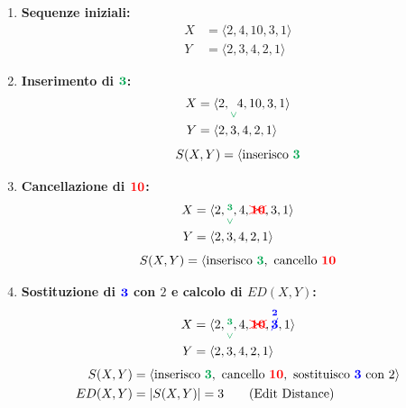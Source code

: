 \begin{enumerate}
    \item \textbf{Sequenze iniziali:}
    \[
    \begin{aligned}
    X &= \langle 2, 4, 10, 3, 1 \rangle \\
    Y &= \langle 2, 3, 4, 2, 1 \rangle
    \end{aligned}
    \]

    \item \textbf{Inserimento di $\textcolor{slidegreen}{\mathbf{3}}$:}
    \[
    \begin{aligned}
    X &= \langle 2, \underset{\textcolor{slidegreen}{\vee}}{\phantom{,}} 4, 10, 3, 1 \rangle \\
    Y &= \langle 2, 3, 4, 2, 1 \rangle
    \end{aligned}
    \]
    \[
    S(X, Y) = \langle \text{inserisco } \textcolor{slidegreen}{\mathbf{3}}
    \]

    \item \textbf{Cancellazione di $\textcolor{red}{\mathbf{10}}$:}
    \[
    \begin{aligned}
    X &= \langle 2, \overset{\textcolor{slidegreen}{\mathbf{3}}}{\underset{\textcolor{slidegreen}{\vee}}{\phantom{,}}}, 4, \textcolor{red}{\xcancel{\mathbf{10}}}, 3, 1 \rangle \\
    Y &= \langle 2, 3, 4, 2, 1 \rangle
    \end{aligned}
    \]
    \[
    S(X, Y) = \langle \text{inserisco } \textcolor{slidegreen}{\mathbf{3}}, \text{ cancello } \textcolor{red}{\mathbf{10}}
    \]

    \item \textbf{Sostituzione di $\textcolor{blue}{\mathbf{3}}$ con $2$ e calcolo di $ED(X, Y)$:}
    \[
    \begin{aligned}
    X &= \langle 2, \overset{\textcolor{slidegreen}{\mathbf{3}}}{\underset{\textcolor{slidegreen}{\vee}}{\phantom{,}}}, 4, \textcolor{red}{\xcancel{\mathbf{10}}}, \overset{\textcolor{blue}{\mathbf{2}}}{\textcolor{blue}{\cancel{\mathbf{3}}}}, 1 \rangle \\
    Y &= \langle 2, 3, 4, 2, 1 \rangle
    \end{aligned}
    \]
    \begin{align*}
    S(X, Y) &= \langle \text{inserisco } \textcolor{slidegreen}{\mathbf{3}}, \text{ cancello } \textcolor{red}{\mathbf{10}}, \text{ sostituisco } \textcolor{blue}{\mathbf{3}} \text{ con } 2 \rangle \\
    ED(X, Y) &= |S(X, Y)| = 3 \qquad (\text{Edit Distance})
    \end{align*}


\end{enumerate}
